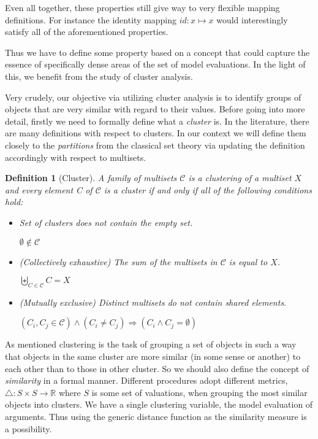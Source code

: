 \documentclass{article}
\newtheorem{definition}{Definition}
\newcommand{\real}{\mathbb{R}}  %
\newcommand{\clusterset}{\mathcal{C}}   %
\begin{document}
Even all together, these properties still give way to very flexible mapping definitions. For instance the identity mapping $id: x \mapsto x$ would interestingly satisfy all of the aforementioned properties.

Thus we have to define some property based on a concept that could capture the essence of specifically dense areas of the set of model evaluations. In the light of this, we benefit from the study of cluster analysis.

Very crudely, our objective via utilizing cluster analysis is to identify groups of objects that are very similar with regard to their values. Before going into more detail, firstly we need to formally define what a \textit{cluster} is.  In the literature, there are many definitions with respect to clusters. In our context we will  define them closely to the \textit{partitions} from the classical set theory via updating the definition accordingly with respect to multisets. 

\begin{definition} [Cluster]
A family of multisets $\clusterset$ is a clustering of a multiset $X$ and every element C of $\clusterset$ is a cluster if and only if all of the following conditions hold:

\begin{itemize}
\item Set of clusters does not contain the empty set.
\begin{center}
$\emptyset \notin \clusterset$
\end{center}
\item (Collectively exhaustive) The sum of the multisets in $\clusterset$ is equal to $X$. 
\begin{center}
$\biguplus _{C \in \clusterset}C = X$
\end{center} 
\item (Mutually exclusive) Distinct multisets do not contain shared elements. %
\begin{center}
$(C_i, C_j \in \clusterset) \wedge (C_i \neq C_j) \Longrightarrow (C_i \wedge C_j = \emptyset)$ 
\end{center}

\end{itemize}
\end{definition}

As mentioned clustering is the task of grouping a set of objects in such a way that objects in the same cluster are more similar (in some sense or another) to each other than to those in other cluster. So we should also define the concept of \textit{similarity} in a formal manner. Different procedures adopt different metrics, $\bigtriangleup: S \times S \rightarrow \real$ where $S$ is some set of valuations, when grouping the most similar objects into clusters. We have a single clustering variable, the model evaluation of arguments. Thus using the generic distance function as the similarity measure is a possibility. 
\end{document}
